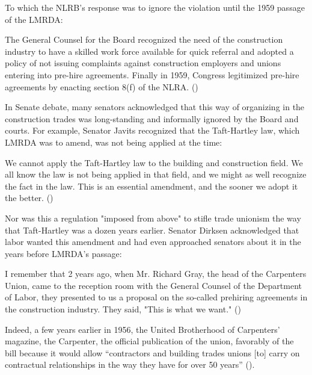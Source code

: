 \documentclass[12pt]{article}
\renewenvironment{quote}
  {\list{}{\leftmargin=\parindent\rightmargin=0pt}%
   \item\relax}
  {\endlist}
\begin{document}
To which the NLRB’s response was to ignore the violation until the 1959 passage of the LMRDA:

\begin{quote}
The General Counsel for the Board recognized the need of the construction industry to have a skilled work force available for quick referral and adopted a policy of not issuing complaints against construction employers and unions entering into pre-hire agreements. Finally in 1959, Congress legitimized pre-hire agreements by enacting section 8(f) of the NLRA. (\cite[1017]{murphyPreHireAgreementsSection1982})
\end{quote}

In Senate debate, many senators acknowledged that this way of organizing in the construction trades was long-standing and informally ignored by the Board and courts. For example, Senator Javits recognized that the Taft-Hartley law, which LMRDA was to amend, was not being applied at the time:

\begin{quote}
We cannot apply the Taft-Hartley law to the building and construction field. We all know the law is not being applied in that field, and we might as well recognize the fact in the law. This is an essential amendment, and the sooner we adopt it the better. (\cite[6395]{105CongressionalRecord1959})
\end{quote}

Nor was this a regulation "imposed from above" to stifle trade unionism the way that Taft-Hartley was a dozen years earlier. Senator Dirksen acknowledged that labor wanted this amendment and had even approached senators about it in the years before LMRDA’s passage:

\begin{quote}
I remember that 2 years ago, when Mr. Richard Gray, the head of the Carpenters Union, came to the reception room with the General Counsel of the Department of Labor, they presented to us a proposal on the so-called prehiring agreements in the construction industry. They said, "This is what we want." (\cite[6414]{105CongressionalRecord1959})
\end{quote}

\noindent
Indeed, a few years earlier in 1956, the United Brotherhood of Carpenters’ magazine, the Carpenter, the official publication of the union, favorably of the bill because it would allow “contractors and building trades unions [to] carry on contractual relationships in the way they have for over 50 years” (\cite[7--8]{ubcActionTalksSay1956}).
\end{document}
